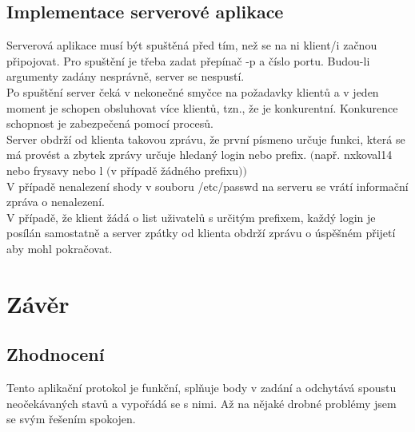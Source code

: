 \documentclass[11pt]{article}
\begin{document}
		\subsection{Implementace serverové aplikace}
			\begin{flushleft}
				Serverová aplikace musí být spuštěná před tím, než se na ni klient/i začnou připojovat. Pro spuštění je třeba zadat přepínač -p a číslo portu. Budou-li argumenty zadány nesprávně, server se nespustí.\\[0.5 cm]
				Po spuštění server čeká v nekonečné smyčce na požadavky klientů a v jeden moment je schopen obsluhovat více klientů, tzn., že je konkurentní. Konkurence schopnost je zabezpečená pomocí procesů.\\[0.5 cm]
				Server obdrží od klienta takovou zprávu, že první písmeno určuje funkci, která se má provést a zbytek zprávy určuje hledaný login nebo prefix. $($např. nxkoval14 nebo frysavy nebo l $($v případě žádného prefixu$))$\\[0.5 cm]
				V případě nenalezení shody v souboru /etc/passwd na serveru se vrátí informační zpráva o nenalezení.\\[0.5 cm]
				V případě, že klient žádá o list uživatelů s určitým prefixem, každý login je posílán samostatně a server zpátky od klienta obdrží zprávu o úspěšném přijetí aby mohl pokračovat.\par
							
			\end{flushleft}	

	
		
	\section{Závěr}
		
			\begin{adjustwidth}{1cm}{0cm}
				\subsection{Zhodnocení}
				\begin{flushleft}
				Tento aplikační protokol je funkční, splňuje body v zadání a odchytává spoustu neočekávaných stavů a vypořádá se s nimi. Až na nějaké drobné problémy jsem se svým řešením spokojen.\par
				\end{flushleft}
			\end{adjustwidth}						
	\vfill
	
\end{document}
